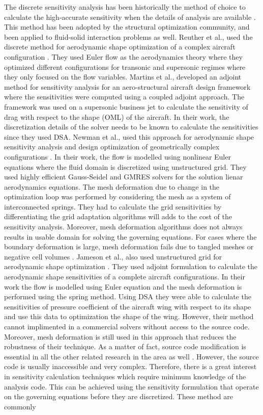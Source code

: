 The discrete sensitivity analysis has been historically the method of choice to calculate the high-accurate sensitivity when the details of analysis are available \cite{arora1979methods}. This method has been adopted by the structural optimization community, and been applied to fluid-solid interaction problems as well. Reuther et al., used the discrete method for aerodynamic shape optimization of a complex aircraft configuration \cite{reuther1999constrained}. They used Euler flow as the aerodynamics theory where they optimized different configurations for transonic and supersonic regimes where they only focused on the flow variables. Martins et al., developed an adjoint method for sensitivity analysis for an aero-structural aircraft design framework where the sensitivities were computed using a coupled adjoint approach. The framework was used on a supersonic business jet to calculate the sensitivity of drag with respect to the shape (OML) of the aircraft. In their work, the discretization details of the solver needs to be known to calculate the sensitivities since they used DSA. Newman et al., used this approach for aerodynamic shape sensitivity analysis and design optimization of geometrically complex configurations \cite{newman1997aerodynamic}. In their work, the flow is modelled using nonlinear Euler equations where the fluid domain is discretized using unstructured grid. They used highly efficient Gauss-Seidel and GMRES solvers for the solution lienar aerodynamics equations. The mesh deformation due to change in the optimization loop was performed by considering the mesh as a system of interconnected springs. They had to calculate the grid sensitivities by differentiating the grid adaptation algorithms will adds to the cost of the sensitivity analysis. Moreover, mesh deformation algorithms does not always results in usable domain for solving the governing equations. For cases where the boundary deformation is large, mesh deformation fails due to tangled meshes or negative cell volumes \cite{morris2008cfd}. Jameson et al., also used unstructured grid for aerodynamic shape optimization \cite{cambridge2004aerodynamic}. They used adjoint formulation to calculate the aerodynamic shape sensitivities of a complete aircraft configurations. In their work the flow is modelled using Euler equation and the mesh deformation is performed using the spring method. Using DSA they were able to calculate the sensitivities of pressure coefficient of the aircraft wing with respect to its shape and use this data to optimization the shape of the wing. However, their method cannot implimented in a commercial solvers without access to the source code. Moreover, mesh deformation is still used in this approach that reduces the robustness of their technique. As a matter of fact, source code modification is essential in all the other related research in the area as well \cite{gamboa2009optimization, pandya1997gradient, kim2001aerodynamic, lyu2014aerodynamic}. However, the source code is usually inaccessible and very complex. Therefore, there is a great interest in sensitivity calculation techniques which require minimum knowledge of the analysis code. This can be achieved using the sensitivity formulation that operate on the governing equations before they are discretized. These method are commonly 
